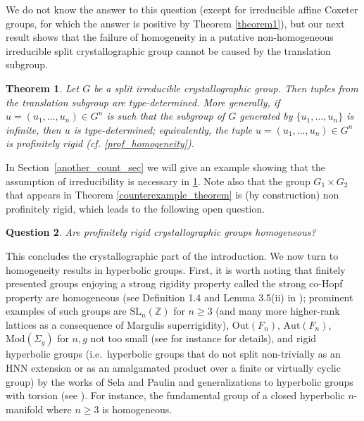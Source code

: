 \documentclass[a4paper, 11pt]{amsart}
\newtheorem{te}{Theorem}[section]
\newtheorem{qu}[te]{Question}
\theoremstyle{definition}
\theoremstyle{remark}
\renewcommand{\geq}{\geqslant}
\begin{document}
We do not know the answer to this question (except for irreducible affine Coxeter groups, for which the answer is positive by Theorem \ref{theorem1}), but our next result shows that the failure of homogeneity in a putative non-homogeneous irreducible split crystallographic group cannot be caused by the translation subgroup. 

\begin{te}\label{type_det1} Let $G$ be a split irreducible  crystallographic group. Then tuples from the translation subgroup are type-determined. More generally, if $u=(u_1,\ldots,u_n)\in G^n$ is such that the subgroup of $G$ generated by $\lbrace u_1,\ldots,u_n\rbrace$ is infinite, then $u$ is type-determined; equivalently, the tuple $u=(u_1,\ldots,u_n)\in G^n$ is profinitely rigid (cf. \ref{prof_homogeneity}).
\end{te}

In Section~\ref{another_count_sec} we will give an example showing that the assumption of irreducibility is necessary in \ref{type_det1}. Note also that the group $G_1\times G_2$ that appears in Theorem \ref{counterexample_theorem} is (by construction) non profinitely rigid, which leads to the following open question. 
	
\begin{qu} Are profinitely rigid crystallographic groups homogeneous?
\end{qu}

	

 This concludes the crystallographic part of the introduction. We now turn to homogeneity results in hyperbolic groups. First, it is worth noting that finitely presented groups enjoying a strong rigidity property called the strong co-Hopf property are homogeneous (see Definition 1.4 and Lemma 3.5(ii) in \cite{OH11}); prominent examples of such groups are $\mathrm{SL}_n(\mathbb{Z})$ for $n\geq 3$ (and many more higher-rank lattices as a consequence of Margulis superrigidity), $\mathrm{Out}(F_n)$, $\mathrm{Aut}(F_n)$, $\mathrm{Mod}(\Sigma_g)$ for $n,g$ not too small (see for instance \cite{And20} for details), and rigid hyperbolic groups (i.e.\ hyperbolic groups that do not split non-trivially as an HNN extension or as an amalgamated product over a finite or virtually cyclic group) by the works of Sela \cite{Sel97,Sel09} and Paulin \cite{Pau97} and generalizations to hyperbolic groups with torsion (see \cite{RW14,Moi13}). For instance, the fundamental group of a closed hyperbolic $n$-manifold where $n\geq 3$ is homogeneous.
\end{document}

